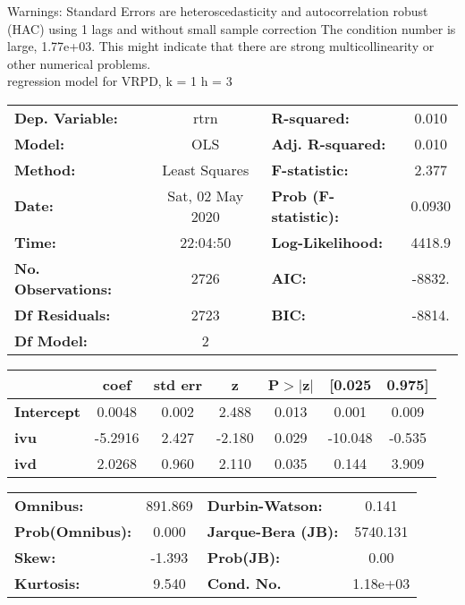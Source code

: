 Warnings: \newline
 [1] Standard Errors are heteroscedasticity and autocorrelation robust (HAC) using 1 lags and without small sample correction \newline
 [2] The condition number is large, 1.77e+03. This might indicate that there are \newline
 strong multicollinearity or other numerical problems.\\ 

regression model for VRPD, k = 1 h = 3\begin{center}
\begin{tabular}{lclc}
\toprule
\textbf{Dep. Variable:}    &       rtrn       & \textbf{  R-squared:         } &     0.010   \\
\textbf{Model:}            &       OLS        & \textbf{  Adj. R-squared:    } &     0.010   \\
\textbf{Method:}           &  Least Squares   & \textbf{  F-statistic:       } &     2.377   \\
\textbf{Date:}             & Sat, 02 May 2020 & \textbf{  Prob (F-statistic):} &   0.0930    \\
\textbf{Time:}             &     22:04:50     & \textbf{  Log-Likelihood:    } &    4418.9   \\
\textbf{No. Observations:} &        2726      & \textbf{  AIC:               } &    -8832.   \\
\textbf{Df Residuals:}     &        2723      & \textbf{  BIC:               } &    -8814.   \\
\textbf{Df Model:}         &           2      & \textbf{                     } &             \\
\bottomrule
\end{tabular}
\begin{tabular}{lcccccc}
                   & \textbf{coef} & \textbf{std err} & \textbf{z} & \textbf{P$> |$z$|$} & \textbf{[0.025} & \textbf{0.975]}  \\
\midrule
\textbf{Intercept} &       0.0048  &        0.002     &     2.488  &         0.013        &        0.001    &        0.009     \\
\textbf{ivu}       &      -5.2916  &        2.427     &    -2.180  &         0.029        &      -10.048    &       -0.535     \\
\textbf{ivd}       &       2.0268  &        0.960     &     2.110  &         0.035        &        0.144    &        3.909     \\
\bottomrule
\end{tabular}
\begin{tabular}{lclc}
\textbf{Omnibus:}       & 891.869 & \textbf{  Durbin-Watson:     } &    0.141  \\
\textbf{Prob(Omnibus):} &   0.000 & \textbf{  Jarque-Bera (JB):  } & 5740.131  \\
\textbf{Skew:}          &  -1.393 & \textbf{  Prob(JB):          } &     0.00  \\
\textbf{Kurtosis:}      &   9.540 & \textbf{  Cond. No.          } & 1.18e+03  \\
\bottomrule
\end{tabular}
\end{center}

